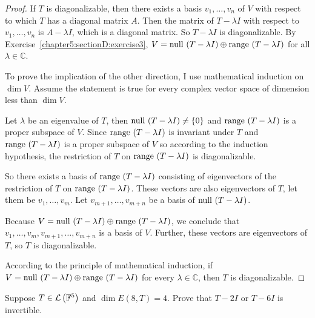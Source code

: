 \begin{proof}
    If $T$ is diagonalizable, then there exists a basis $v_{1}, \ldots, v_{n}$ of $V$ with respect to which $T$ has a diagonal matrix $A$. Then the matrix of $T - \lambda I$ with respect to $v_{1}, \ldots, v_{n}$ is $A - \lambda I$, which is a diagonal matrix. So $T - \lambda I$ is diagonalizable. By Exercise~\ref{chapter5:sectionD:exercise3}, $V = \operatorname{null}\,{(T - \lambda I)}\oplus \operatorname{range}\,{(T - \lambda I)}$ for all $\lambda\in \mathbb{C}$.

    To prove the implication of the other direction, I use mathematical induction on $\dim V$. Assume the statement is true for every complex vector space of dimension less than $\dim V$.

    Let $\lambda$ be an eigenvalue of $T$, then $\operatorname{null}\,{(T - \lambda I)}\ne \{0\}$ and $\operatorname{range}\,{(T - \lambda I)}$ is a proper subspace of $V$. Since $\operatorname{range}\,{(T - \lambda I)}$ is invariant under $T$ and $\operatorname{range}\,{(T - \lambda I)}$ is a proper subspace of $V$ so according to the induction hypothesis, the restriction of $T$ on $\operatorname{range}\,{(T - \lambda I)}$ is diagonalizable.

    So there exists a basis of $\operatorname{range}\,{(T - \lambda I)}$ consisting of eigenvectors of the restriction of $T$ on $\operatorname{range}\,{(T - \lambda I)}$. These vectors are also eigenvectors of $T$, let them be $v_{1}, \ldots, v_{m}$. Let $v_{m+1}, \ldots, v_{m+n}$ be a basis of $\operatorname{null}\,{(T - \lambda I)}$.

    Because $V = \operatorname{null}\,{(T - \lambda I)} \oplus \operatorname{range}\,{(T - \lambda I)}$, we conclude that $v_{1}, \ldots, v_{m}, v_{m+1}, \ldots, v_{m+n}$ is a basis of $V$. Further, these vectors are eigenvectors of $T$, so $T$ is diagonalizable.

    According to the principle of mathematical induction, if $V = \operatorname{null}\,{(T - \lambda I)} \oplus \operatorname{range}\,{(T - \lambda I)}$ for every $\lambda\in\mathbb{C}$, then $T$ is diagonalizable.
\end{proof}
\newpage

\begin{exercise}
    Suppose $T\in\mathcal{L}\left({\mathbb{F}^{5}}\right)$ and $\dim E(8, T) = 4$. Prove that $T - 2I$ or $T - 6I$ is invertible.
\end{exercise}

